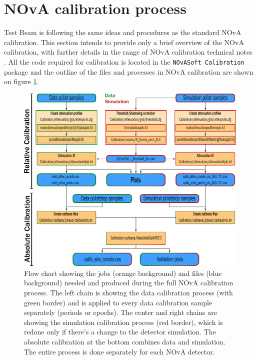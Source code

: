 \documentclass[12pt,a4paper]{article}
\begin{document}

\section{NOvA calibration process}
Test Beam is following the same ideas and procedures as the standard NOvA calibration. This section intends to provide only a brief overview of the NOvA calibration, with further details in the range of NOvA calibration technical notes \cite{NOVA-doc-13579}. All the code required for calibration is located in the \texttt{NOvASoft Calibration} package and the outline of the files and processes in NOvA calibration are shown on figure \ref{figCalibrationFlowchart}.

\begin{figure}[!hbtp]
\centering
\includegraphics[width=\textwidth]{Plots/CalibrationFlowChart.png}
\caption{Flow chart showing the jobs (orange background) and files (blue background) needed and produced during the full NOvA calibration process. The left chain is showing the data calibration process (with green border) and is applied to every data calibration sample separately (periods or epochs). The center and right chains are showing the simulation calibration process (red border), which is redone only if there's a change to the detector simulation. The absolute calibration at the bottom combines data and simulation. The entire process is done separately for each NOvA detector.} 
\label{figCalibrationFlowchart}
\end{figure}
\end{document}
